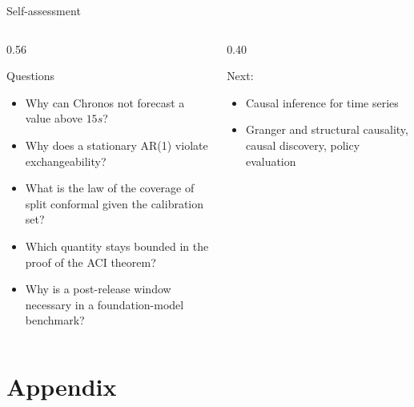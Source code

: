 \begin{frame}{Self-assessment}
\itemsize{\small}
\begin{columns}[T]
\begin{column}{0.56\textwidth}
\begin{block}{Questions}
\begin{itemize}
    \item Why can Chronos not forecast a value above $15s$?
    \item Why does a stationary AR(1) violate exchangeability?
    \item What is the law of the coverage of split conformal given the calibration set?
    \item Which quantity stays bounded in the proof of the ACI theorem?
    \item Why is a post-release window necessary in a foundation-model benchmark?
\end{itemize}
\end{block}
\end{column}
\begin{column}{0.40\textwidth}
\begin{block}{Next: }
\begin{itemize}
    \item Causal inference for time series
    \item Granger and structural causality, causal discovery, policy evaluation
\end{itemize}
\end{block}
\end{column}
\end{columns}
\end{frame}


\section{Appendix}

